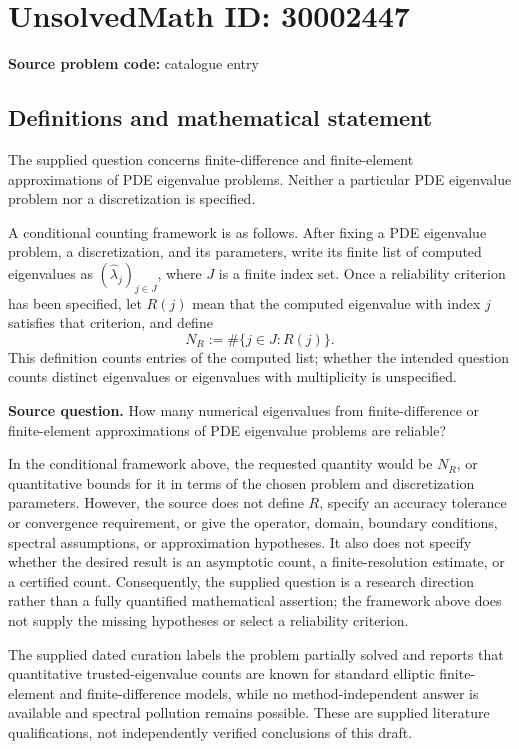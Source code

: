 \documentclass[11pt]{article}
\begin{document}
\section*{UnsolvedMath ID: 30002447}
\textbf{Source problem code:} catalogue entry
\subsection{Definitions and mathematical statement}
The supplied question concerns finite-difference and finite-element approximations of PDE eigenvalue problems. Neither a particular PDE eigenvalue problem nor a discretization is specified.

A conditional counting framework is as follows. After fixing a PDE eigenvalue problem, a discretization, and its parameters, write its finite list of computed eigenvalues as \((\widehat\lambda_j)_{j\in J}\), where \(J\) is a finite index set. Once a reliability criterion has been specified, let \(R(j)\) mean that the computed eigenvalue with index \(j\) satisfies that criterion, and define
\[
N_R:=\#\{j\in J:R(j)\}.
\]
This definition counts entries of the computed list; whether the intended question counts distinct eigenvalues or eigenvalues with multiplicity is unspecified.

\textbf{Source question.} How many numerical eigenvalues from finite-difference or finite-element approximations of PDE eigenvalue problems are reliable?

In the conditional framework above, the requested quantity would be \(N_R\), or quantitative bounds for it in terms of the chosen problem and discretization parameters. However, the source does not define \(R\), specify an accuracy tolerance or convergence requirement, or give the operator, domain, boundary conditions, spectral assumptions, or approximation hypotheses. It also does not specify whether the desired result is an asymptotic count, a finite-resolution estimate, or a certified count. Consequently, the supplied question is a research direction rather than a fully quantified mathematical assertion; the framework above does not supply the missing hypotheses or select a reliability criterion.

The supplied dated curation labels the problem partially solved and reports that quantitative trusted-eigenvalue counts are known for standard elliptic finite-element and finite-difference models, while no method-independent answer is available and spectral pollution remains possible. These are supplied literature qualifications, not independently verified conclusions of this draft.
\end{document}
